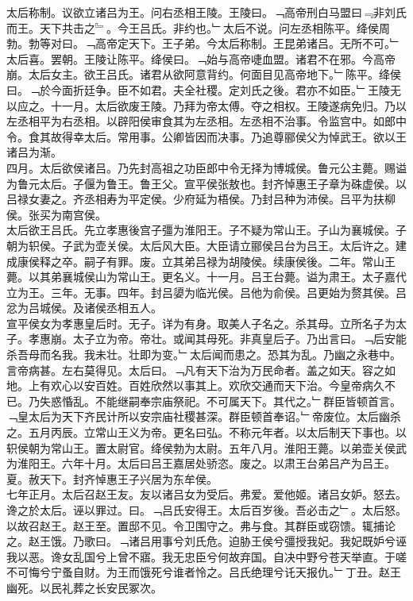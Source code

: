 \documentclass{zhvt-classic}
\begin{document}
\hspace*{2em}太后称制。议欲立诸吕为王。问右丞相王陵。王陵曰。﹁高帝刑白马盟曰﹃非刘氏而王。天下共击之﹄。今王吕氏。非约也。﹂太后不说。问左丞相陈平。绛侯周勃。勃等对曰。﹁高帝定天下。王子弟。今太后称制。王昆弟诸吕。无所不可。﹂太后喜。罢朝。王陵让陈平。绛侯曰。﹁始与高帝啑血盟。诸君不在邪。今高帝崩。太后女主。欲王吕氏。诸君从欲阿意背约。何面目见高帝地下。﹂陈平。绛侯曰。﹁於今面折廷争。臣不如君。夫全社稷。定刘氏之後。君亦不如臣。﹂王陵无以应之。十一月。太后欲废王陵。乃拜为帝太傅。夺之相权。王陵遂病免归。乃以左丞相平为右丞相。以辟阳侯审食其为左丞相。左丞相不治事。令监宫中。如郎中令。食其故得幸太后。常用事。公卿皆因而决事。乃追尊郦侯父为悼武王。欲以王诸吕为渐。\\
\hspace*{2em}四月。太后欲侯诸吕。乃先封高祖之功臣郎中令无择为博城侯。鲁元公主薨。赐谥为鲁元太后。子偃为鲁王。鲁王父。宣平侯张敖也。封齐悼惠王子章为硃虚侯。以吕禄女妻之。齐丞相寿为平定侯。少府延为梧侯。乃封吕种为沛侯。吕平为扶柳侯。张买为南宫侯。\\
\hspace*{2em}太后欲王吕氏。先立孝惠後宫子彊为淮阳王。子不疑为常山王。子山为襄城侯。子朝为轵侯。子武为壶关侯。太后风大臣。大臣请立郦侯吕台为吕王。太后许之。建成康侯释之卒。嗣子有罪。废。立其弟吕禄为胡陵侯。续康侯後。二年。常山王薨。以其弟襄城侯山为常山王。更名义。十一月。吕王台薨。谥为肃王。太子嘉代立为王。三年。无事。四年。封吕嬃为临光侯。吕他为俞侯。吕更始为赘其侯。吕忿为吕城侯。及诸侯丞相五人。\\
\hspace*{2em}宣平侯女为孝惠皇后时。无子。详为有身。取美人子名之。杀其母。立所名子为太子。孝惠崩。太子立为帝。帝壮。或闻其母死。非真皇后子。乃出言曰。﹁后安能杀吾母而名我。我未壮。壮即为变。﹂太后闻而患之。恐其为乱。乃幽之永巷中。言帝病甚。左右莫得见。太后曰。﹁凡有天下治为万民命者。盖之如天。容之如地。上有欢心以安百姓。百姓欣然以事其上。欢欣交通而天下治。今皇帝病久不已。乃失惑惛乱。不能继嗣奉宗庙祭祀。不可属天下。其代之。﹂群臣皆顿首言。﹁皇太后为天下齐民计所以安宗庙社稷甚深。群臣顿首奉诏。﹂帝废位。太后幽杀之。五月丙辰。立常山王义为帝。更名曰弘。不称元年者。以太后制天下事也。以轵侯朝为常山王。置太尉官。绛侯勃为太尉。五年八月。淮阳王薨。以弟壶关侯武为淮阳王。六年十月。太后曰吕王嘉居处骄恣。废之。以肃王台弟吕产为吕王。夏。赦天下。封齐悼惠王子兴居为东牟侯。\\
\hspace*{2em}七年正月。太后召赵王友。友以诸吕女为受后。弗爱。爱他姬。诸吕女妒。怒去。谗之於太后。诬以罪过。曰。﹁吕氏安得王。太后百岁後。吾必击之﹂。太后怒。以故召赵王。赵王至。置邸不见。令卫围守之。弗与食。其群臣或窃馈。辄捕论之。赵王饿。乃歌曰。﹁诸吕用事兮刘氏危。迫胁王侯兮彊授我妃。我妃既妒兮诬我以恶。谗女乱国兮上曾不寤。我无忠臣兮何故弃国。自决中野兮苍天举直。于嗟不可悔兮宁蚤自财。为王而饿死兮谁者怜之。吕氏绝理兮讬天报仇。﹂丁丑。赵王幽死。以民礼葬之长安民冢次。\\
\end{document}
